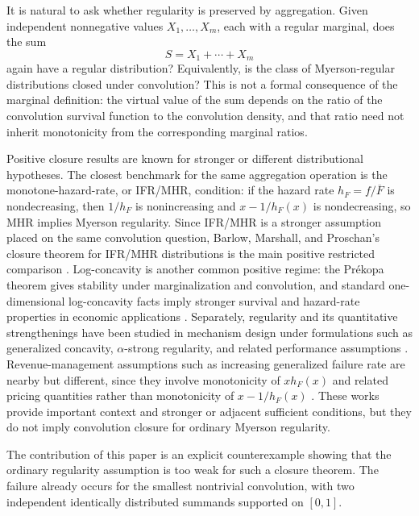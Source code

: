 \documentclass[11pt]{article}
\begin{document}
It is natural to ask whether regularity is preserved by aggregation.  Given
independent nonnegative values $X_1,\ldots,X_m$, each with a regular marginal,
does the sum
\[
S=X_1+\cdots+X_m
\]
again have a regular distribution?  Equivalently, is the class of
Myerson-regular distributions closed under convolution?  This is not a formal
consequence of the marginal definition: the virtual value of the sum depends on
the ratio of the convolution survival function to the convolution density, and
that ratio need not inherit monotonicity from the corresponding marginal
ratios.

Positive closure results are known for stronger or different distributional
hypotheses.  The closest benchmark for the same aggregation operation is the
monotone-hazard-rate, or IFR/MHR, condition: if the hazard rate
$h_F=f/\overline F$ is nondecreasing, then $1/h_F$ is nonincreasing and
$x-1/h_F(x)$ is nondecreasing, so MHR implies Myerson regularity.  Since
IFR/MHR is a stronger assumption placed on the same convolution question,
Barlow, Marshall, and Proschan's closure theorem for IFR/MHR distributions is
the main positive restricted comparison \cite{BarlowMarshallProschan1963MHR}.
Log-concavity is another common positive regime: the Pr{\'e}kopa theorem gives
stability under marginalization and convolution, and standard one-dimensional
log-concavity facts imply stronger survival and hazard-rate properties in
economic applications
\cite{Prekopa1973LogConcave,BagnoliBergstrom2005LogConcave}.  Separately,
regularity and its quantitative strengthenings have been studied in mechanism
design under formulations such as generalized concavity, $\alpha$-strong
regularity, and related performance assumptions
\cite{Ewerhart2013RegularType,ColeRoughgarden2014SampleComplexity,ColeRao2015AlphaStronglyRegular,SchweizerSzech2019PerformanceBounds}.
Revenue-management assumptions such as increasing generalized failure rate are
nearby but different, since they involve monotonicity of $x h_F(x)$ and related
pricing quantities rather than monotonicity of $x-1/h_F(x)$
\cite{Lariviere2006IGFR,ZiyaAyhanFoley2004RevenueManagement,BanciuMirchandani2013IGFR}.
These works provide important context and stronger or adjacent sufficient
conditions, but they do not imply convolution closure for ordinary Myerson
regularity.

The contribution of this paper is an explicit counterexample showing that the
ordinary regularity assumption is too weak for such a closure theorem.  The
failure already occurs for the smallest nontrivial convolution, with two
independent identically distributed summands supported on $[0,1]$.
\end{document}

